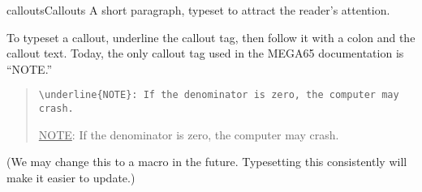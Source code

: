 \begin{sgentry}{callouts}{Callouts}
    A short paragraph, typeset to attract the reader's attention.

    To typeset a callout, underline the callout tag, then follow it with a colon and the callout text. Today, the only callout tag used in the MEGA65 documentation is ``NOTE.''

    \begin{quote}
        \texttt{{\textbackslash}underline\{NOTE\}: If the denominator is zero, the computer may crash.}

        \hrulefill

        \underline{NOTE}: If the denominator is zero, the computer may crash.
    \end{quote}

    (We may change this to a macro in the future. Typesetting this consistently will make it easier to update.)
\end{sgentry}

